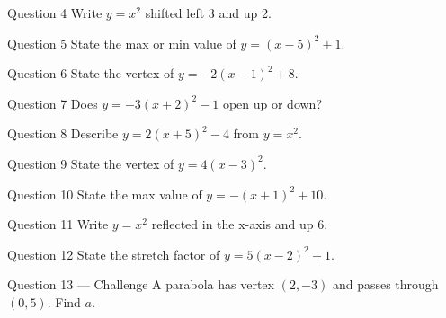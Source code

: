 \documentclass[11pt]{article}
\begin{document}
\begin{qbox}{Question 4}
Write $y=x^2$ shifted left 3 and up 2.\workspace{2.4cm}
\end{qbox}

\begin{qbox}{Question 5}
State the max or min value of $y=(x-5)^2+1$.\workspace{2.4cm}
\end{qbox}

\begin{qbox}{Question 6}
State the vertex of $y=-2(x-1)^2+8$.\workspace{2.4cm}
\end{qbox}

\begin{qbox}{Question 7}
Does $y=-3(x+2)^2-1$ open up or down?\workspace{2.4cm}
\end{qbox}

\begin{qbox}{Question 8}
Describe $y=2(x+5)^2-4$ from $y=x^2$.\workspace{2.4cm}
\end{qbox}

\begin{qbox}{Question 9}
State the vertex of $y=4(x-3)^2$.\workspace{2.4cm}
\end{qbox}

\begin{qbox}{Question 10}
State the max value of $y=-(x+1)^2+10$.\workspace{2.4cm}
\end{qbox}

\begin{qbox}{Question 11}
Write $y=x^2$ reflected in the x-axis and up 6.\workspace{2.4cm}
\end{qbox}

\begin{qbox}{Question 12}
State the stretch factor of $y=5(x-2)^2+1$.\workspace{2.4cm}
\end{qbox}

\begin{qbox}{Question 13 --- Challenge}
A parabola has vertex $(2,-3)$ and passes through $(0,5)$. Find $a$.\workspace{3cm}
\end{qbox}

\clearpage
{}
\end{document}

